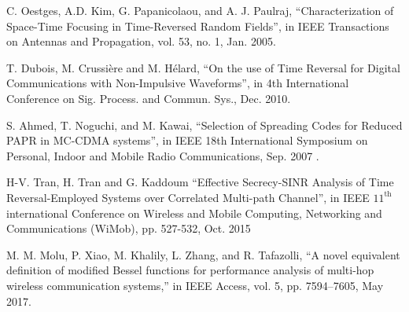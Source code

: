 \documentclass[a4paper,11pt]{article}
\begin{document}
\begin{thebibliography}{1}
 C. Oestges, A.D. Kim, G. Papanicolaou, and A. J. Paulraj, ``Characterization of Space-Time Focusing in Time-Reversed Random Fields'', in IEEE Transactions on Antennas and Propagation, vol. 53, no. 1, Jan. 2005.



 T. Dubois, M. Crussi\`{e}re and M.   H\'{e}lard, ``On the use of Time Reversal for Digital Communications with Non-Impulsive Waveforms'', in 4th International Conference on Sig. Process. and Commun. Sys., Dec. 2010.
 

  S. Ahmed, T. Noguchi, and M. Kawai, ``Selection of Spreading Codes for Reduced PAPR in MC-CDMA systems'', in  IEEE 18th International Symposium on Personal, Indoor and Mobile Radio Communications,  Sep. 2007 .

 H-V. Tran, H. Tran and G. Kaddoum
``Effective Secrecy-SINR Analysis of Time Reversal-Employed Systems over Correlated Multi-path Channel'', in IEEE $11^{\text{th}}$ international Conference on Wireless and Mobile Computing, Networking and Communications (WiMob), pp. 527-532, Oct. 2015

 M. M. Molu, P. Xiao, M. Khalily, L. Zhang, and R. Tafazolli, ``A novel equivalent definition of modified Bessel functions for performance
analysis of multi-hop wireless communication systems,'' in IEEE Access,
vol. 5, pp. 7594–7605, May 2017.


\end{thebibliography}
\end{document}
